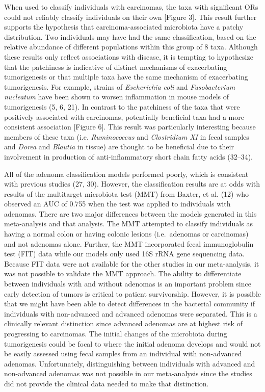 \documentclass[12pt,]{article}
\begin{document}
When used to classify individuals with carcinomas, the taxa with
significant ORs could not reliably classify individuals on their own
{[}Figure 3{]}. This result further supports the hypothesis that
carcinoma-associated microbiota have a patchy distribution. Two
individuals may have had the same classification, based on the relative
abundance of different populations within this group of 8 taxa. Although
these results only reflect associations with disease, it is tempting to
hypothesize that the patchiness is indicative of distinct mechanisms of
exacerbating tumorigenesis or that multiple taxa have the same mechanism
of exacerbating tumorigenesis. For example, strains of \emph{Escherichia
coli} and \emph{Fusobacterium nucleatum} have been shown to worsen
inflammation in mouse models of tumorigenesis (5, 6, 21). In contrast to
the patchiness of the taxa that were positively associated with
carcinomas, potentially beneficial taxa had a more consistent
association {[}Figure 6{]}. This result was particularly interesting
because members of these taxa (i.e. \emph{Ruminococcus} and
\emph{Clostridium XI} in fecal samples and \emph{Dorea} and
\emph{Blautia} in tissue) are thought to be beneficial due to their
involvement in production of anti-inflammatory short chain fatty acids
(32--34).

All of the adenoma classification models performed poorly, which is
consistent with previous studies (27, 30). However, the classification
results are at odds with results of the multitarget microbiota test
(MMT) from Baxter, et al. (12) who observed an AUC of 0.755 when the
test was applied to individuals with adenomas. There are two major
differences between the models generated in this meta-analysis and that
analysis. The MMT attempted to classify individuals as having a normal
colon or having colonic lesions (i.e.~adenomas or carcinomas) and not
adenomas alone. Further, the MMT incorporated fecal immunoglobulin test
(FIT) data while our models only used 16S rRNA gene sequencing data.
Because FIT data were not available for the other studies in our
meta-analysis, it was not possible to validate the MMT approach. The
ability to differentiate between individuals with and without adenomas
is an important problem since early detection of tumors is critical to
patient survivorship. However, it is possible that we might have been
able to detect differences in the bacterial community if individuals
with non-advanced and advanced adenomas were separated. This is a
clinically relevant distinction since advanced adenomas are at highest
risk of progressing to carcinomas. The initial changes of the microbiota
during tumorigenesis could be focal to where the initial adenoma
develops and would not be easily assessed using fecal samples from an
individual with non-advanced adenomas. Unfortunately, distinguishing
between individuals with advanced and non-advanced adenomas was not
possible in our meta-analysis since the studies did not provide the
clinical data needed to make that distinction.
\end{document}
